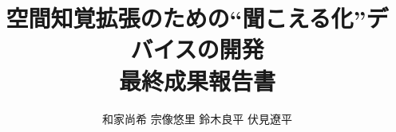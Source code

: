 \documentclass[11pt]{jsarticle}
\begin{document}
 \makeatletter
    \renewcommand{\thefigure}{
    \thesection.\arabic{figure}}
  \makeatother

  \makeatletter
    \renewcommand{\thetable}{%
    \thesection.\arabic{table}}
  \makeatother

\title{空間知覚拡張のための``聞こえる化''デバイスの開発\\最終成果報告書}
\author{和家尚希 宗像悠里 鈴木良平 伏見遼平}
\maketitle

\tableofcontents %
\thispagestyle{empty} %












\end{document}

